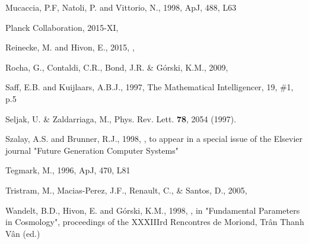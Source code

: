\documentclass[12pt,twoside]{article}
\begin{document}
\begin{thebibliography}{99}
Mucaccia, P.F, Natoli, P. and Vittorio, N., 1998, ApJ, 488, L63
\backrefprint%

Planck Collaboration, 2015-XI, 
\backrefprint%

Reinecke, M. and Hivon, E., 2015, 
, 
\backrefprint%

Rocha, G., Contaldi, C.R., Bond, J.R. \& G\'orski, K.M., 2009,
\backrefprint%

Saff, E.B. and Kuijlaars, A.B.J., 1997, The Mathematical 
Intelligencer, 19, \#1, p.5
\backrefprint%

Seljak, U. \& Zaldarriaga, M., Phys. Rev. Lett. \textbf{78}, 2054 (1997).   
\backrefprint%

Szalay, A.S. and Brunner, R.J., 1998, 
, to appear in 
a special issue of the Elsevier journal "Future Generation Computer Systems"
\backrefprint%

Tegmark, M., 1996, ApJ, 470, L81
\backrefprint%

Tristram, M., Macias-Perez, J.F., Renault, C., \& Santos, D., 2005, 
\backrefprint%

Wandelt, B.D., Hivon, E. and G\'orski, K.M., 1998, 
, in
 "Fundamental Parameters in Cosmology", proceedings of the XXXIIIrd Rencontres
de Moriond, Tr{\^a}n Thanh V{\^a}n (ed.)
\backrefprint%


\end{thebibliography}
\end{document}
